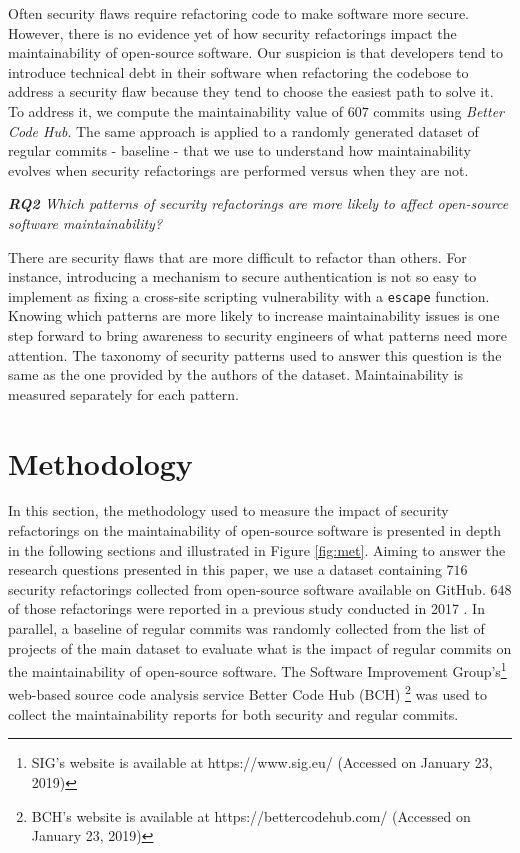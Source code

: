 \documentclass[10pt,conference]{IEEEtran}
\begin{document}
Often security flaws require refactoring code to make software more secure. However, there is no evidence yet of how security refactorings impact the maintainability of open-source software. Our suspicion is that developers tend to introduce technical debt in their software when refactoring the codebose to address a security flaw because they tend to choose the easiest path to solve it. To address it, we compute the maintainability value of $607$ commits using \emph{Better Code Hub}. The same approach is applied to a randomly generated dataset of regular commits - baseline - that we use to understand how maintainability evolves when security refactorings are performed versus when they are not.

\begin{framed}
\textit{\textbf{RQ2} Which patterns of security refactorings are more likely to affect open-source software maintainability?}
\end{framed}

There are security flaws that are more difficult to refactor than others. For instance, introducing a mechanism to secure authentication is not so easy to implement as fixing a cross-site scripting vulnerability with a \texttt{escape} function. Knowing which patterns are more likely to increase maintainability issues is one step forward to bring awareness to security engineers of what patterns need more attention. The taxonomy of security patterns used to answer this question is the same as the one provided by the authors of the dataset. Maintainability is measured separately for each pattern.


\section{Methodology}\label{sec:methodology}

In this section, the methodology used to measure the impact of security refactorings on the maintainability of open-source software is presented in depth in the following sections and illustrated in Figure \ref{fig:met}. Aiming to answer the research questions presented in this paper, we use a dataset containing $716$ security refactorings collected from open-source software available on GitHub. $648$ of those refactorings were reported in a previous study conducted in 2017 \cite{Reis:2017:IJSSE}. In parallel, a baseline of regular commits was randomly collected from the list of projects of the main dataset to evaluate what is the impact of regular commits on the maintainability of open-source software. The Software Improvement Group's\footnote{SIG's website is available at https://www.sig.eu/ (Accessed on January 23, 2019)} web-based source code analysis service Better Code Hub (BCH) \footnote{BCH's website is available at https://bettercodehub.com/ (Accessed on January 23, 2019)} was used to collect the maintainability reports for both security and regular commits.
\end{document}
